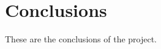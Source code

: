 \chapter*{Conclusions}

These are the conclusions of the project.

\clearpage{\thispagestyle{empty}}

